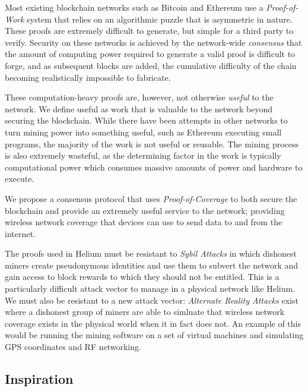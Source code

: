 \documentclass[letterpaper,11pt]{article}
\def\proofofcoverage/{\textit{Proof-of-Coverage}}
\begin{document}
Most existing blockchain networks such as Bitcoin \cite{bitcoin} and Ethereum \cite{ethereum} use a \textit{Proof-of-Work} system that relies on an algorithmic puzzle that is asymmetric in nature. These proofs are extremely difficult to generate, but simple for a third party to verify. Security on these networks is achieved by the network-wide \textit{consensus} that the amount of computing power required to generate a valid proof is difficult to forge, and as subsequent blocks are added, the cumulative difficulty of the chain becoming realistically impossible to fabricate. \newline

These computation-heavy proofs are, however, not otherwise \textit{useful} to the network. We define useful as work that is valuable to the network beyond securing the blockchain. While there have been attempts in other networks to turn mining power into something useful, such as Ethereum executing small programs, the majority of the work is not useful or reusable. The mining process is also extremely wasteful, as the determining factor in the work is typically computational power which consumes massive amounts of power and hardware to execute.\newline

We propose a consensus protocol that uses \proofofcoverage/ to both secure the blockchain and provide an extremely useful service to the network; providing wireless network coverage that devices can use to send data to and from the internet.\newline

The proofs used in Helium must be resistant to \textit{Sybil Attacks} in which dishonest miners create pseudonymous identities and use them to subvert the network and gain access to block rewards to which they should not be entitled. This is a particularly difficult attack vector to manage in a physical network like Helium. We must also be resistant to a new attack vector: \textit{Alternate Reality Attacks} exist where a dishonest group of miners are able to simluate that wireless network coverage exists in the physical world when it in fact does not. An example of this would be running the mining software on a set of virtual machines and simulating GPS coordinates and RF networking.

\subsection{Inspiration}
\end{document}
